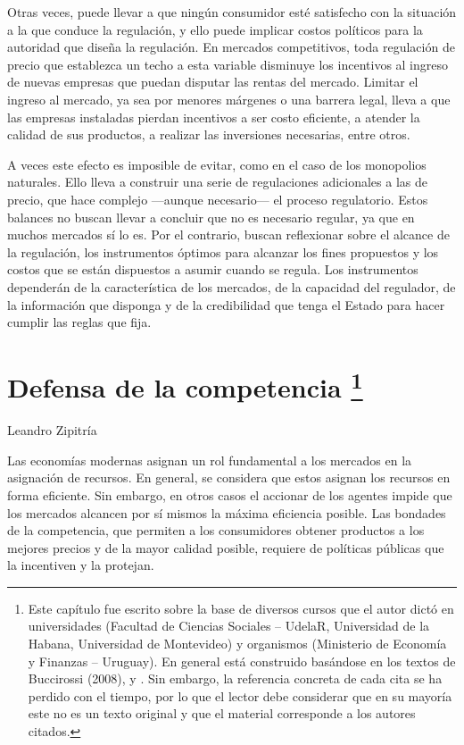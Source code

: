 \documentclass[
  12pt,
  spanish,
]{book}
\begin{document}
Otras veces, puede llevar a que ningún consumidor esté satisfecho con la
situación a la que conduce la regulación, y ello puede implicar costos
políticos para la autoridad que diseña la regulación. En mercados
competitivos, toda regulación de precio que establezca un techo a esta
variable disminuye los incentivos al ingreso de nuevas empresas que
puedan disputar las rentas del mercado. Limitar el ingreso al mercado,
ya sea por menores márgenes o una barrera legal, lleva a que las
empresas instaladas pierdan incentivos a ser costo eficiente, a atender
la calidad de sus productos, a realizar las inversiones necesarias,
entre otros.

A veces este efecto es imposible de evitar, como en el caso de los
monopolios naturales. Ello lleva a construir una serie de regulaciones
adicionales a las de precio, que hace complejo ---aunque necesario--- el
proceso regulatorio. Estos balances no buscan llevar a concluir que no
es necesario regular, ya que en muchos mercados sí lo es. Por el
contrario, buscan reflexionar sobre el alcance de la regulación, los
instrumentos óptimos para alcanzar los fines propuestos y los costos que
se están dispuestos a asumir cuando se regula. Los instrumentos
dependerán de la característica de los mercados, de la capacidad del
regulador, de la información que disponga y de la credibilidad que tenga
el Estado para hacer cumplir las reglas que fija.

\hypertarget{def-comp}{%
\chapter[Defensa de la competencia ]{\texorpdfstring{Defensa de la
competencia \footnote{Este capítulo fue escrito sobre la base de
  diversos cursos que el autor dictó en universidades (Facultad de
  Ciencias Sociales -- UdelaR, Universidad de la Habana, Universidad de
  Montevideo) y organismos (Ministerio de Economía y Finanzas --
  Uruguay). En general está construido basándose en los textos de
  Buccirossi (2008), \citet{Motta2004} y \citet{Viscusi2005}. Sin
  embargo, la referencia concreta de cada cita se ha perdido con el
  tiempo, por lo que el lector debe considerar que en su mayoría este no
  es un texto original y que el material corresponde a los autores
  citados.}}{Defensa de la competencia }}\label{def-comp}}

Leandro Zipitría

Las economías modernas asignan un rol fundamental a los mercados en la
asignación de recursos. En general, se considera que estos asignan los
recursos en forma eficiente. Sin embargo, en otros casos el accionar de
los agentes impide que los mercados alcancen por sí mismos la máxima
eficiencia posible. Las bondades de la competencia, que permiten a los
consumidores obtener productos a los mejores precios y de la mayor
calidad posible, requiere de políticas públicas que la incentiven y la
protejan.
\end{document}
